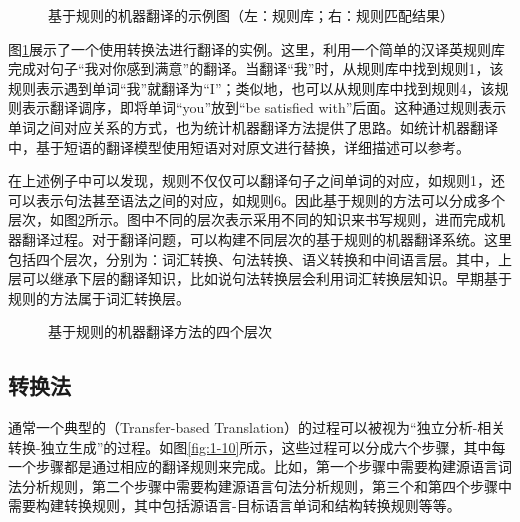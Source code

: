 \begin{figure}[htp]
    \centering

    \caption{基于规则的机器翻译的示例图（左：规则库；右：规则匹配结果）}
    \label{fig:1-8}
\end{figure}

\parinterval 图\ref{fig:1-8}展示了一个使用转换法进行翻译的实例。这里，利用一个简单的汉译英规则库完成对句子“我对你感到满意”的翻译。当翻译“我”时，从规则库中找到规则1，该规则表示遇到单词“我”就翻译为“I”；类似地，也可以从规则库中找到规则4，该规则表示翻译调序，即将单词“you”放到“be satisfied with”后面。这种通过规则表示单词之间对应关系的方式，也为统计机器翻译方法提供了思路。如统计机器翻译中，基于短语的翻译模型使用短语对对原文进行替换，详细描述可以参考{\chapterseven}。

\parinterval 在上述例子中可以发现，规则不仅仅可以翻译句子之间单词的对应，如规则1，还可以表示句法甚至语法之间的对应，如规则6。因此基于规则的方法可以分成多个层次，如图\ref{fig:1-9}所示。图中不同的层次表示采用不同的知识来书写规则，进而完成机器翻译过程。对于翻译问题，可以构建不同层次的基于规则的机器翻译系统。这里包括四个层次，分别为：词汇转换、句法转换、语义转换和中间语言层。其中，上层可以继承下层的翻译知识，比如说句法转换层会利用词汇转换层知识。早期基于规则的方法属于词汇转换层。

\begin{figure}[htp]
    \centering

    \caption{基于规则的机器翻译方法的四个层次}
\setlength{\belowcaptionskip}{-1.5em}
    \label{fig:1-9}
\end{figure}


\subsection{转换法}

\parinterval 通常一个典型的{\small{}}（Transfer-based Translation）的过程可以被视为“独立分析-相关转换-独立生成”的过程。如图\ref{fig:1-10}所示，这些过程可以分成六个步骤，其中每一个步骤都是通过相应的翻译规则来完成。比如，第一个步骤中需要构建源语言词法分析规则，第二个步骤中需要构建源语言句法分析规则，第三个和第四个步骤中需要构建转换规则，其中包括源语言-目标语言单词和结构转换规则等等。

